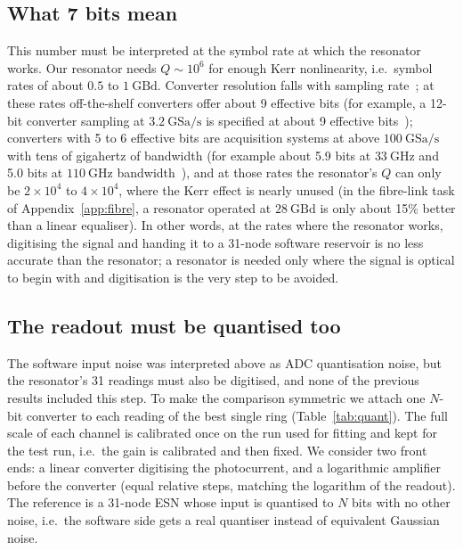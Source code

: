 \subsection{What 7 bits mean}

This number must be interpreted at the symbol rate at which the resonator works. Our resonator needs $Q\sim10^{6}$ for enough Kerr nonlinearity,
i.e.\ symbol rates of about $0.5$ to $1~\mathrm{GBd}$. Converter resolution falls with sampling rate~\cite{walden1999}; at these rates
off-the-shelf converters offer about 9 effective bits (for
example, a 12-bit converter sampling at $3.2~\mathrm{GSa/s}$ is specified at about 9 effective bits~\cite{ti_adc12dj3200}); converters
with 5 to 6 effective bits are acquisition systems at above $100~\mathrm{GSa/s}$ with tens of gigahertz of bandwidth (for example about
5.9 bits at $33~\mathrm{GHz}$ and 5.0 bits at $110~\mathrm{GHz}$ bandwidth~\cite{keysight_uxr}), and at those rates the resonator's $Q$
can only be $2\times10^{4}$ to $4\times10^{4}$, where the Kerr effect is nearly unused (in the fibre-link task of
Appendix~\ref{app:fibre}, a resonator operated at $28~\mathrm{GBd}$ is only about 15\% better than a linear equaliser). In other
words, at the rates where the resonator works, digitising the signal and handing it to a 31-node software reservoir is no less
accurate than the resonator; a resonator is needed only where the signal is optical to begin with and digitisation is the very
step to be avoided.

\subsection{The readout must be quantised too}\label{sec:quant}

The software input noise was interpreted above as ADC quantisation noise, but the resonator's 31 readings must also be digitised,
and none of the previous results included this step. To make the comparison symmetric we attach one $N$-bit converter to each reading
of the best single ring (Table~\ref{tab:quant}). The full scale of each channel is calibrated once on the run used for fitting and
kept for the test run, i.e.\ the gain is calibrated and then fixed. We consider two front ends: a linear converter digitising the
photocurrent, and a logarithmic amplifier before the converter (equal relative steps, matching the logarithm of the readout). The
reference is a 31-node ESN whose input is quantised to $N$ bits with no other noise, i.e.\ the software side gets a real quantiser
instead of equivalent Gaussian noise.

